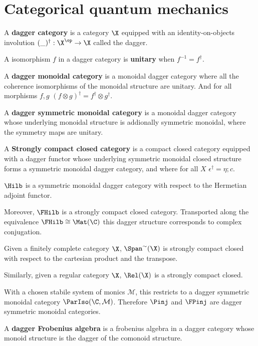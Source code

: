 \section{Categorical quantum mechanics}
\begin{definition}
\label{def:dag}
A {\bf dagger category} is a category $\X$ equipped with an identity-on-objects involution $(\_)^\dag:\X^\op\to\X$ called the dagger.

A isomorphism $f$ in a dagger category is {\bf unitary} when $f^{-1}=f^\dag$.


A {\bf dagger monoidal  category} is a monoidal dagger category where all the coherence isomorphisms of the monoidal structure are unitary. And for all morphisms $f,g$ $(f \otimes g)^\dag = f^\dag \otimes g^\dag$.

A {\bf dagger symmetric monoidal  category} is a monoidal dagger category whose underlying monoidal structure is addionally symmetric monoidal, where the symmetry maps are unitary.

A {\bf Strongly compact closed category } is a compact closed category equipped with a dagger functor whose underlying symmetric monoidal closed structure forms a symmetric monoidal dagger category, and where for all $X$ $\epsilon^\dagger = \eta;c$.
\end{definition}

\begin{example}
$\Hilb$ is a symmetric monoidal dagger category with respect to the Hermetian adjoint functor.

Moreover, $\FHilb$ is a strongly compact closed category.  Transported along the equivalence $\FHilb\cong \Mat(\C)$ this dagger structure corresponds to complex conjugation.
\end{example}


\begin{example}
Given a finitely complete category $\X$, $\Span^\sim (\X)$ is strongly compact closed with respect to the cartesian product and the transpose.

Similarly, given a regular category $\X$, $\Rel(\X)$ is a strongly compact closed.

With a chosen stabile system of monics $\mathcal M$, this restricts to a dagger symmetric monoidal category $\ParIso(\C,{\mathcal M})$. Therefore $\Pinj$ and $\FPinj$ are dagger symmetric monoidal categories.
\end{example}



\begin{definition}
\label{def:specialdagfa}
A {\bf dagger Frobenius algebra}  is a frobenius algebra in a dagger category whose monoid structure is the dagger of the comonoid structure.

\end{definition}

